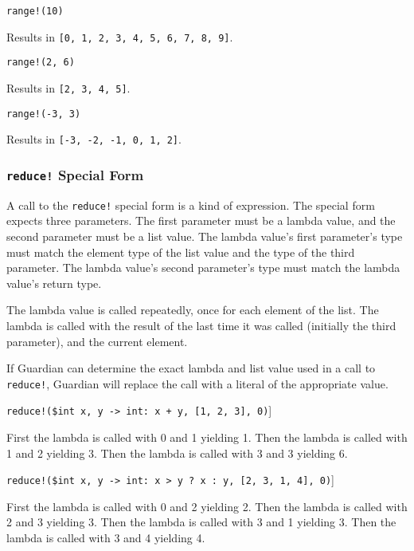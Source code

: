 {{		\begin{itemize}
		{
			\item \texttt{range!(10)}
			
				Results in \texttt{[0, 1, 2, 3, 4, 5, 6, 7, 8, 9]}.
			
			\item \texttt{range!(2, 6)}
			
				Results in \texttt{[2, 3, 4, 5]}.
				
			\item \texttt{range!(-3, 3)}
			
				Results in \texttt{[-3, -2, -1, 0, 1, 2]}.
		}
		\end{itemize}
	}
	
	\subsubsection{\texttt{reduce!} Special Form}
	{
		A call to the \texttt{reduce!} special form is a kind of expression.
		The special form expects three parameters.
		The first parameter must be a lambda value, and the
		second parameter must be a list value.
		The lambda value's first parameter's type
		must match the element type of the list value and the type of the third
		parameter. The lambda value's
		second parameter's type must match the lambda value's return type.
		
		The lambda value is called repeatedly, once for each element of the list.
		The lambda is called with the result of the last time it was
		called (initially the third parameter), and
		the current element.
		
		If Guardian can determine the exact lambda and list value used in a call to
		\texttt{reduce!}, Guardian will replace the call with a literal of
		the appropriate value.
		
		\begin{itemize}
		{
			\item \texttt{reduce!(\$int x, y -> int: x + y, [1, 2, 3], 0)}]
			
				First the lambda is called with 0 and 1 yielding 1.
				Then the lambda is called with 1 and 2 yielding 3.
				Then the lambda is called with 3 and 3 yielding 6.
			
			\item \texttt{reduce!(\$int x, y -> int: x > y ? x : y, [2, 3, 1, 4], 0)}]
			
				First the lambda is called with 0 and 2 yielding 2.
				Then the lambda is called with 2 and 3 yielding 3.
				Then the lambda is called with 3 and 1 yielding 3.
				Then the lambda is called with 3 and 4 yielding 4.
			
}
\end{itemize}}}
